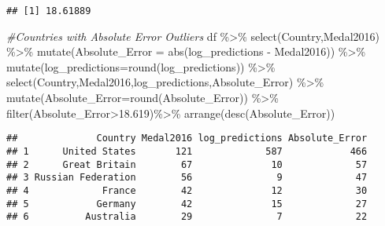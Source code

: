 \documentclass[
]{article}
\newenvironment{Shaded}{\begin{snugshade}}{\end{snugshade}}
\newcommand{\AttributeTok}[1]{\textcolor[rgb]{0.77,0.63,0.00}{#1}}
\newcommand{\CommentTok}[1]{\textcolor[rgb]{0.56,0.35,0.01}{\textit{#1}}}
\newcommand{\FloatTok}[1]{\textcolor[rgb]{0.00,0.00,0.81}{#1}}
\newcommand{\FunctionTok}[1]{\textcolor[rgb]{0.00,0.00,0.00}{#1}}
\newcommand{\NormalTok}[1]{#1}
\newcommand{\SpecialCharTok}[1]{\textcolor[rgb]{0.00,0.00,0.00}{#1}}
\begin{document}
\begin{Shaded}
\end{Shaded}

\begin{verbatim}
## [1] 18.61889
\end{verbatim}

\begin{Shaded}
\begin{Highlighting}[]
\CommentTok{\#Countries with Absolute Error Outliers}
\NormalTok{df }\SpecialCharTok{\%\textgreater{}\%} 
  \FunctionTok{select}\NormalTok{(Country,Medal2016) }\SpecialCharTok{\%\textgreater{}\%}
  \FunctionTok{mutate}\NormalTok{(}\AttributeTok{Absolute\_Error =} \FunctionTok{abs}\NormalTok{(log\_predictions }\SpecialCharTok{{-}}\NormalTok{ Medal2016)) }\SpecialCharTok{\%\textgreater{}\%}
  \FunctionTok{mutate}\NormalTok{(}\AttributeTok{log\_predictions=}\FunctionTok{round}\NormalTok{(log\_predictions)) }\SpecialCharTok{\%\textgreater{}\%}
  \FunctionTok{select}\NormalTok{(Country,Medal2016,log\_predictions,Absolute\_Error) }\SpecialCharTok{\%\textgreater{}\%}
  \FunctionTok{mutate}\NormalTok{(}\AttributeTok{Absolute\_Error=}\FunctionTok{round}\NormalTok{(Absolute\_Error)) }\SpecialCharTok{\%\textgreater{}\%}
  \FunctionTok{filter}\NormalTok{(Absolute\_Error}\SpecialCharTok{\textgreater{}}\FloatTok{18.619}\NormalTok{)}\SpecialCharTok{\%\textgreater{}\%}
  \FunctionTok{arrange}\NormalTok{(}\FunctionTok{desc}\NormalTok{(Absolute\_Error))}
\end{Highlighting}
\end{Shaded}

\begin{verbatim}
##              Country Medal2016 log_predictions Absolute_Error
## 1      United States       121             587            466
## 2      Great Britain        67              10             57
## 3 Russian Federation        56               9             47
## 4             France        42              12             30
## 5            Germany        42              15             27
## 6          Australia        29               7             22
\end{verbatim}
\end{document}
